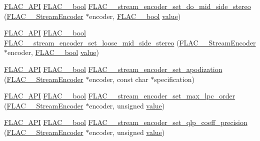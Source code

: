 \begin{DoxyCompactItemize}
\item 
\mbox{\hyperlink{group__flac__export_ga56ca07df8a23310707732b1c0007d6f5}{F\+L\+A\+C\+\_\+\+A\+PI}} \mbox{\hyperlink{ordinals_8h_a95103469f1cbd78b8cf250194985b34e}{F\+L\+A\+C\+\_\+\+\_\+bool}} \mbox{\hyperlink{group__flac__stream__encoder_gadbd1084da109cf0ddd007a5c64027504}{F\+L\+A\+C\+\_\+\+\_\+stream\+\_\+encoder\+\_\+set\+\_\+do\+\_\+mid\+\_\+side\+\_\+stereo}} (\mbox{\hyperlink{struct_f_l_a_c_____stream_encoder}{F\+L\+A\+C\+\_\+\+\_\+\+Stream\+Encoder}} $\ast$encoder, \mbox{\hyperlink{ordinals_8h_a95103469f1cbd78b8cf250194985b34e}{F\+L\+A\+C\+\_\+\+\_\+bool}} \mbox{\hyperlink{_s_d_l__opengl__glext_8h_a8ad81492d410ff2ac11f754f4042150f}{value}})
\item 
\mbox{\hyperlink{group__flac__export_ga56ca07df8a23310707732b1c0007d6f5}{F\+L\+A\+C\+\_\+\+A\+PI}} \mbox{\hyperlink{ordinals_8h_a95103469f1cbd78b8cf250194985b34e}{F\+L\+A\+C\+\_\+\+\_\+bool}} \mbox{\hyperlink{group__flac__stream__encoder_ga7b7d294dccd5df7c6c67e75f59798f48}{F\+L\+A\+C\+\_\+\+\_\+stream\+\_\+encoder\+\_\+set\+\_\+loose\+\_\+mid\+\_\+side\+\_\+stereo}} (\mbox{\hyperlink{struct_f_l_a_c_____stream_encoder}{F\+L\+A\+C\+\_\+\+\_\+\+Stream\+Encoder}} $\ast$encoder, \mbox{\hyperlink{ordinals_8h_a95103469f1cbd78b8cf250194985b34e}{F\+L\+A\+C\+\_\+\+\_\+bool}} \mbox{\hyperlink{_s_d_l__opengl__glext_8h_a8ad81492d410ff2ac11f754f4042150f}{value}})
\item 
\mbox{\hyperlink{group__flac__export_ga56ca07df8a23310707732b1c0007d6f5}{F\+L\+A\+C\+\_\+\+A\+PI}} \mbox{\hyperlink{ordinals_8h_a95103469f1cbd78b8cf250194985b34e}{F\+L\+A\+C\+\_\+\+\_\+bool}} \mbox{\hyperlink{group__flac__stream__encoder_ga83d38fd6fca7abbf8363bdc2536a299e}{F\+L\+A\+C\+\_\+\+\_\+stream\+\_\+encoder\+\_\+set\+\_\+apodization}} (\mbox{\hyperlink{struct_f_l_a_c_____stream_encoder}{F\+L\+A\+C\+\_\+\+\_\+\+Stream\+Encoder}} $\ast$encoder, const char $\ast$specification)
\item 
\mbox{\hyperlink{group__flac__export_ga56ca07df8a23310707732b1c0007d6f5}{F\+L\+A\+C\+\_\+\+A\+PI}} \mbox{\hyperlink{ordinals_8h_a95103469f1cbd78b8cf250194985b34e}{F\+L\+A\+C\+\_\+\+\_\+bool}} \mbox{\hyperlink{group__flac__stream__encoder_gac3bde5abdaa340674c5659e2e85d2611}{F\+L\+A\+C\+\_\+\+\_\+stream\+\_\+encoder\+\_\+set\+\_\+max\+\_\+lpc\+\_\+order}} (\mbox{\hyperlink{struct_f_l_a_c_____stream_encoder}{F\+L\+A\+C\+\_\+\+\_\+\+Stream\+Encoder}} $\ast$encoder, unsigned \mbox{\hyperlink{_s_d_l__opengl__glext_8h_a8ad81492d410ff2ac11f754f4042150f}{value}})
\item 
\mbox{\hyperlink{group__flac__export_ga56ca07df8a23310707732b1c0007d6f5}{F\+L\+A\+C\+\_\+\+A\+PI}} \mbox{\hyperlink{ordinals_8h_a95103469f1cbd78b8cf250194985b34e}{F\+L\+A\+C\+\_\+\+\_\+bool}} \mbox{\hyperlink{group__flac__stream__encoder_ga0888d739c952ff73456bf90e48634514}{F\+L\+A\+C\+\_\+\+\_\+stream\+\_\+encoder\+\_\+set\+\_\+qlp\+\_\+coeff\+\_\+precision}} (\mbox{\hyperlink{struct_f_l_a_c_____stream_encoder}{F\+L\+A\+C\+\_\+\+\_\+\+Stream\+Encoder}} $\ast$encoder, unsigned \mbox{\hyperlink{_s_d_l__opengl__glext_8h_a8ad81492d410ff2ac11f754f4042150f}{value}})

\end{DoxyCompactItemize}

